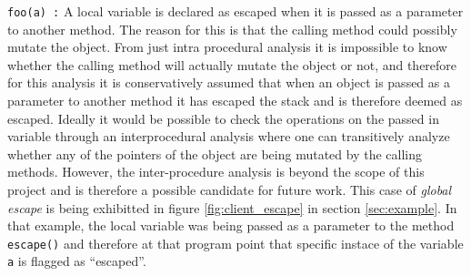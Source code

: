 \texttt{foo(a) :} A local variable is declared as escaped when it is passed as a parameter to another method. The reason for this is that the calling method could possibly mutate the object. From just intra procedural analysis it is impossible to know whether the calling method will actually mutate the object or not, and therefore for this analysis it is conservatively assumed that when an object is passed as a parameter to another method it has escaped the stack and is therefore deemed as escaped. Ideally it would be possible to check the operations on the passed in variable through an interprocedural analysis where one can transitively analyze whether any of the pointers of the object are being mutated by the calling methods. However, the inter-procedure analysis is beyond the scope of this project and is therefore a possible candidate for future work. This case of \textit{global escape} is being exhibitted in figure \ref{fig:client_escape} in section \ref{sec:example}. In that example, the local variable was being passed as a parameter to the method \texttt{escape()} and therefore at that program point that specific instace of the variable \texttt{a} is flagged as ``escaped''.

